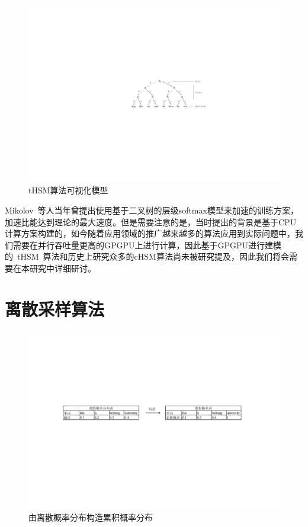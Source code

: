 \begin{figure}[!t]
  \centering
\includegraphics[width=.85\linewidth]{./figures/thsm-example.pdf}
\caption{tHSM算法可视化模型}\label{fig:case_thsm}
\end{figure}

Mikolov~等人当年曾提出使用基于二叉树的层级softmax模型来加速的训练方案，加速比能达到理论的最大速度。但是需要注意的是，当时提出的背景是基于CPU计算方案构建的，如今随着应用领域的推广越来越多的算法应用到实际问题中，我们需要在并行吞吐量更高的GPGPU上进行计算，因此基于GPGPU进行建模的~tHSM~算法和历史上研究众多的cHSM算法尚未被研究提及，因此我们将会需要在本研究中详细研讨。

\section{离散采样算法}
\begin{figure}[!b]
  \centering
\includegraphics[width=1\linewidth]{./figures/cdfreverse.pdf}
\caption{由离散概率分布构造累积概率分布}\label{fig:cdf_reverse}
\end{figure}


